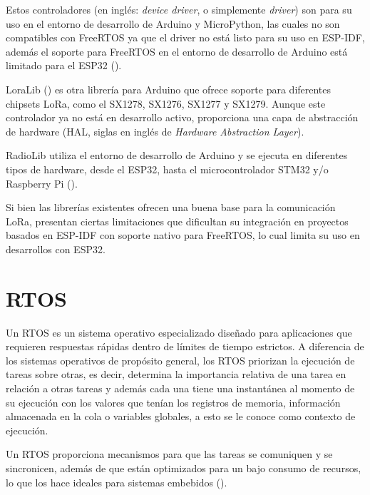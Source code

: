 Estos controladores (en inglés: \textit{device driver}, o simplemente \textit{driver}) son para su uso en el entorno de desarrollo de Arduino y MicroPython, las cuales no son compatibles con FreeRTOS ya que el driver no está listo para su uso en ESP-IDF, además el soporte para FreeRTOS en el entorno de desarrollo de Arduino está limitado para el ESP32 (\cite{ladyada2016}).

\vspace{0.5cm}

LoraLib (\cite{jangromes2020}) es otra librería para Arduino que ofrece soporte para diferentes chipsets LoRa, como el SX1278, SX1276, SX1277 y SX1279. Aunque este controlador ya no está en desarrollo activo, proporciona una capa de abstracción de hardware (HAL, siglas en inglés de \textit{Hardware Abstraction Layer}).

\vspace{0.5cm}

RadioLib utiliza el entorno de desarrollo de Arduino y se ejecuta en diferentes tipos de hardware, desde el ESP32, hasta el microcontrolador STM32 y/o Raspberry Pi (\cite{jangromes2024}). 

\vspace{0.5cm}

Si bien las librerías existentes ofrecen una buena base para la comunicación LoRa, presentan ciertas limitaciones que dificultan su integración en proyectos basados en ESP-IDF con soporte nativo para FreeRTOS, lo cual limita su uso en desarrollos con ESP32. 

\section{RTOS}

Un RTOS es un sistema operativo especializado diseñado para aplicaciones que requieren respuestas rápidas dentro de límites de tiempo estrictos. A diferencia de los sistemas operativos de propósito general, los RTOS priorizan la ejecución de tareas sobre otras, es decir, determina la importancia relativa de una tarea en relación a otras tareas y además cada una tiene una instantánea al momento de su ejecución con los valores que tenían los registros de memoria, información almacenada en la cola o variables globales, a esto se le conoce como contexto de ejecución.

\vspace{0.5cm}

Un RTOS proporciona mecanismos para que las tareas se comuniquen y se sincronicen, además de que están optimizados para un bajo consumo de recursos, lo que los hace ideales para sistemas embebidos (\cite{digikey_rtos}).

